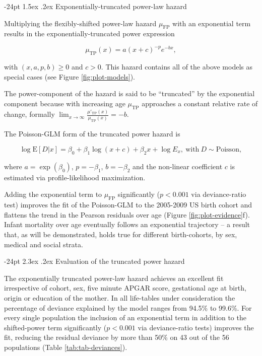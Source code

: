 \documentclass[10pt, twoside, parskip=half]{article}
\makeatletter
\renewcommand\section{\@startsection {section}{1}{\z@}%
                                   {-24pt}%
                                   {2.3ex \@plus.2ex}%
                                   {\normalfont\large\bfseries}}
\renewcommand\subsection{\@startsection{subsection}{2}{\z@}%
                                     {-24pt}%
                                     {1.5ex \@plus .2ex}%
                                     {\normalfont\normalsize\bfseries}}
\makeatother
\begin{document}
\subsection{Exponentially-truncated power-law
hazard}\label{exponentially-truncated-power-law-hazard}

Multiplying the flexibly-shifted power-law hazard \(\mu_\text{FP}\) with
an exponential term results in the exponentially-truncated power
expression

\[
\mu_\text{TP}(x) = a(x+c)^{-p}e^{-bx},
\]

with \((x, a, p, b)\geq 0\) and \(c>0\). This hazard contains all of the
above models as special cases (see Figure \ref{fig:plot-models}).

The power-component of the hazard is said to be ``truncated'' by the
exponential component because with increasing age \(\mu_\text{TP}\)
approaches a constant relative rate of change, formally
\(\lim_{x\to\infty}\frac{\mu'_\text{TP}(x)}{\mu_\text{TP}(x)}=-b\).

The Poisson-GLM form of the truncated power hazard is

\[
\log\text{E}[D|x] = \beta_0 + \beta_1\log(x+c) + \beta_2x+\log E_x,~\text{with}~D\sim\text{Poisson},
\]

where \(a = \exp(\beta_0)\), \(p = -\beta_1\), \(b = -\beta_2\) and the
non-linear coefficient \(c\) is estimated via profile-likelihood
maximization.

Adding the exponential term to \(\mu_\text{FP}\) significantly
(\(p<0.001\) via deviance-ratio test) improves the fit of the
Poisson-GLM to the 2005-2009 US birth cohort and flattens the trend in
the Pearson residuals over age (Figure \ref{fig:plot-evidence}f). Infant
mortality over age eventually follows an exponential trajectory -- a
result that, as will be demonstrated, holds true for different
birth-cohorts, by sex, medical and social strata.

\section{Evaluation of the truncated power
hazard}\label{evaluation-of-the-truncated-power-hazard}

The exponentially truncated power-law hazard achieves an excellent fit
irrespective of cohort, sex, five minute APGAR score, gestational age at
birth, origin or education of the mother. In all life-tables under
consideration the percentage of deviance explained by the model ranges
from 94.5\% to 99.6\%. For every single population the inclusion of an
exponential term in addition to the shifted-power term significantly
(\(p<0.001\) via deviance-ratio tests) improves the fit, reducing the
residual deviance by more than 50\% on 43 out of the 56 populations
(Table \ref{tab:tab-deviances}).
\end{document}
